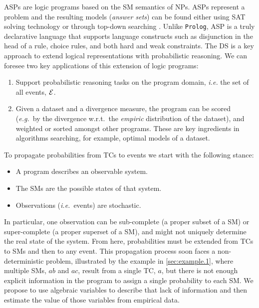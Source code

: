 \documentclass[a4paper]{article}
\renewcommand{\cite}{\citep}
\newcommand{\cla}[1]{\ensuremath{{\cal #1}}}        %
\newcommand{\EVENTSset}{\ensuremath{\cla{E}}}
\begin{document}
\Acp{ASP} \cite{lifschitz2002answer,lifschitz2008twelve} are logic
programs based on the \acl{SM} semantics of \acp{NP}.  \Acp{ASP}
represent a problem and the resulting models (\emph{answer sets}) can
be found either using SAT solving technology
\cite{gebser2011potassco,adrian2018asp,niemela1997smodels} or through
top-down searching
\cite{alberti2017cplint,arias2020justifications,marple2017computing}.
Unlike \texttt{Prolog}, \ac{ASP} is a truly declarative language that
supports language constructs such as disjunction in the head of a
rule, choice rules, and both hard and weak constraints.
%
The \ac{DS} \cite{sato1995statistical,riguzzi2022foundations} is a key
approach to extend logical representations with probabilistic
reasoning.  We can foresee two key applications of this extension of
logic programs:
%
\begin{enumerate}
\item Support probabilistic reasoning tasks on the program domain,
  \textit{i.e.} the set of all events, \(\EVENTSset\).
\item Given a dataset and a divergence measure, the program can be
  scored (\textit{e.g.}\ by the divergence w.r.t.\ the \emph{empiric}
  distribution of the dataset), and weighted or sorted amongst other
  programs.  These are key ingredients in algorithms searching, for
  example, optimal models of a dataset.
\end{enumerate}

To propagate probabilities from \aclp{TC} to events we start with the
following stance:
\begin{itemize}
\item A program describes an observable system.
\item The \aclp{SM} are the possible states of that system.
\item Observations (\textit{i.e.}\ events) are stochastic.
\end{itemize}

In particular, one observation can be sub-complete (a proper subset of
a \ac{SM}) or super-complete (a proper superset of a \ac{SM}), and
might not uniquely determine the real state of the system.  From here,
probabilities must be extended from \acp{TC} to \acp{SM} and then to
any event.
%
This propagation process soon faces a non-deterministic problem,
illustrated by the example in \cref{sec:example.1}, where multiple
\acp{SM}, \(ab\) and \(ac\), result from a single \ac{TC}, \(a\), but
there is not enough explicit information in the program to assign a
single probability to each \ac{SM}.
%
We propose to use algebraic variables to describe that lack of
information and then estimate the value of those variables from
empirical data.
\end{document}

